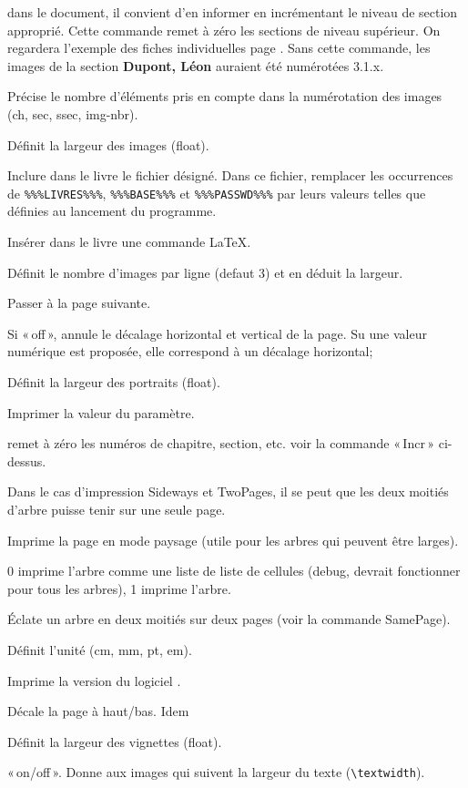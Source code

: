 \begin{description}[style=nextline]
dans le document, il convient d'en informer \gwtol{} en incrémentant
le niveau de section approprié. Cette commande remet à zéro les sections de
niveau supérieur. On regardera l'exemple des fiches individuelles
page \pageref{fiches}. Sans cette commande, les images de la section
{\bf Dupont, Léon} auraient été numérotées 3.1.x.
\item[ImageLabel] Précise le nombre d'éléments pris en compte dans
la numérotation des images (ch, sec, ssec, img-nbr).
\item[ImgWidth] Définit la largeur des images (float).
\item[Input] Inclure dans le livre le fichier désigné. Dans ce fichier,
remplacer les occurrences de \verb|%%%LIVRES%%%|, \verb|%%%BASE%%%| et
\verb|%%%PASSWD%%%| par leurs valeurs telles que définies au lancement du programme.
\item[LaTeX] Insérer dans le livre une commande \LaTeX{}.
\item[NbImgPerLine] Définit le nombre d'images par ligne (defaut 3) et en
déduit la largeur.
\item[Newpage] Passer à la page suivante.
\item[Offset] Si «\,off\,», annule le décalage horizontal et vertical de la page.
Su une valeur numérique est proposée, elle correspond à un décalage horizontal;
\item[PortraitWidth] Définit la largeur des portraits (float).
\item[Print] Imprimer la valeur du paramètre.
\item[Reset] remet à zéro les numéros de chapitre, section, etc.
voir la commande «\,Incr\,» ci-dessus.
\item[SamePage] Dans le cas d'impression Sideways et TwoPages,
il se peut que les deux moitiés d'arbre puisse tenir sur une seule page.
\item[Sideways] Imprime la page en mode paysage (utile pour les arbres
qui peuvent être larges).\label{sideways}
\item[TreeMode] 0 imprime l'arbre comme une liste de liste de cellules
(debug, devrait fonctionner pour tous les arbres), 1 imprime l'arbre.
\item[TwoPages] Éclate un arbre en deux moitiés sur deux pages (voir la commande SamePage).
\item[Unit] Définit l'unité (cm, mm, pt, em).
\item[Version] Imprime la version du logiciel \gwtol{}.
\item[Voffset] Décale la page à haut/bas. Idem
\item[VignWidth] Définit la largeur des vignettes (float).
\item[WideImages] «\,on/off\,». Donne aux images qui suivent la largeur du texte
(\verb|\textwidth|).

\end{description}

